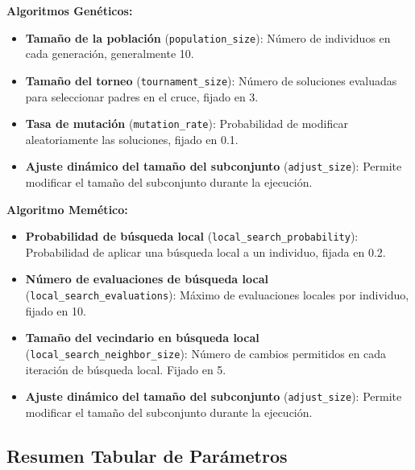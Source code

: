 \textbf{Algoritmos Genéticos:}
\begin{itemize}
    \item \textbf{Tamaño de la población} (\texttt{population\_size}): Número de individuos en cada generación, generalmente 10.
    \item \textbf{Tamaño del torneo} (\texttt{tournament\_size}): Número de soluciones evaluadas para seleccionar padres en el cruce, fijado en 3.
    \item \textbf{Tasa de mutación} (\texttt{mutation\_rate}): Probabilidad de modificar aleatoriamente las soluciones, fijado en 0.1.
    \item \textbf{Ajuste dinámico del tamaño del subconjunto} (\texttt{adjust\_size}): Permite modificar el tamaño del subconjunto durante la ejecución.
\end{itemize}

\textbf{Algoritmo Memético:}
\begin{itemize}
    \item \textbf{Probabilidad de búsqueda local} (\texttt{local\_search\_probability}): Probabilidad de aplicar una búsqueda local a un individuo, fijada en 0.2.
    \item \textbf{Número de evaluaciones de búsqueda local} \\(\texttt{local\_search\_evaluations}): Máximo de evaluaciones locales por individuo, fijado en 10.
    \item \textbf{Tamaño del vecindario en búsqueda local} \\(\texttt{local\_search\_neighbor\_size}): Número de cambios permitidos en cada iteración de búsqueda local.
          Fijado en 5.
    \item \textbf{Ajuste dinámico del tamaño del subconjunto} (\texttt{adjust\_size}): Permite modificar el tamaño del subconjunto durante la ejecución.
\end{itemize}

\subsection{Resumen Tabular de Parámetros}\label{subsec:resumen-parametros}

